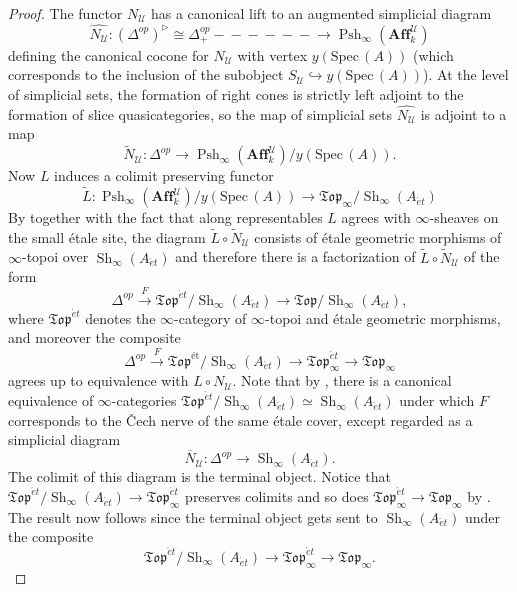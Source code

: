 \documentclass[12pt]{amsart}
\theoremstyle{definition}
\newcommand{\cU}{\mathcal{U}}
\newcommand{\Affku}{\mathbf{Aff}^{\cU}_{k}}
\newcommand{\Topi}{\mathfrak{Top}_\i}
\newcommand{\Spec}{\mathrm{Spec}\,}
\newcommand{\Sh}{\operatorname{Sh}}
\newcommand{\et}{\acute{e}t}
\renewcommand{\i}{\infty}
\def\Pshi{\operatorname{Psh}_\i}
\def\Shi{\Sh_\i}
\def\longlongrightarrow{-\!\!\!-\!\!\!-\!\!\!-\!\!\!-\!\!\!-\!\!\!\longrightarrow}
\begin{document}
\begin{proof}
The functor $N_\mathcal{U}$ has a canonical lift to an augmented simplicial diagram $$\widehat{N_\mathcal{U}}:\left(\Delta^{op}\right)^{\triangleright}\cong \Delta_{+}^{op} \longlongrightarrow \Pshi\left(\Affku\right)$$ defining the canonical cocone for $N_\mathcal{U}$ with vertex $y\left(\Spec\left(A\right)\right)$ (which corresponds to the inclusion of the subobject $S_\mathcal{U} \hookrightarrow y\left(\Spec\left(A\right)\right)$). At the level of simplicial sets, the formation of right cones is strictly left adjoint to the formation of slice quasicategories, so the map of simplicial sets $\widehat{N_\mathcal{U}}$ is adjoint to a map $$\widetilde{N}_\mathcal{U}:\Delta^{op} \to \Pshi\left(\Affku\right)/y\left(\Spec\left(A\right)\right).$$ Now $L$ induces a colimit preserving functor $$\widetilde{L}:\Pshi\left(\Affku\right)/y\left(\Spec\left(A\right)\right) \to \mathfrak{Top}_\i/\Shi\left(A_{\et}\right)$$ By \cite[Example 2.3.8]{dagv} together with the fact that along representables $L$ agrees with $\i$-sheaves on the small \'etale site, the diagram $\widetilde{L}\circ \widetilde{N}_{\mathcal{U}}$ consists of \'etale geometric morphisms of $\i$-topoi over $\Shi\left(A_{\et}\right)$ and therefore there is a factorization of $\widetilde{L}\circ \widetilde{N}_{\mathcal{U}}$ of the form $$\Delta^{op} \stackrel{F}{\longrightarrow} \mathfrak{Top}^{\et}/\Shi\left(A_{\et}\right) \to \mathfrak{Top}/\Shi\left(A_{\et}\right),$$ where $ \mathfrak{Top}^{\et}$ denotes the $\i$-category of $\i$-topoi and \'etale geometric morphisms, and moreover the composite $$\Delta^{op} \stackrel{F}{\longrightarrow} \mathfrak{Top}^{\mbox{\'et}}/\Shi\left(A_{\et}\right) \to \mathfrak{Top}^{\et}_\i \to \mathfrak{Top}_\i$$ agrees up to equivalence with $L \circ N_{\cU}.$ Note that by \cite[Remark 6.3.5.10]{htt}, there is a canonical equivalence of $\i$-categories $\mathfrak{Top}^{\et}/\Shi\left(A_{\et}\right) \simeq \Shi\left(A_{\et}\right)$ under which $F$ corresponds to the \v{C}ech nerve of the same \'etale cover, except regarded as a simplicial diagram $$\overline{N}_{\cU}:\Delta^{op} \to \Shi\left(A_{\et}\right).$$ The colimit of this diagram is the terminal object. Notice that $\mathfrak{Top}^{\et}/\Shi\left(A_{\et}\right) \to \mathfrak{Top}^{\et}_\i$ preserves colimits and so does $\mathfrak{Top}^{\et}_\i \to \mathfrak{Top}_\i$ by \cite[Theorem 6.3.5.13]{htt}. The result now follows since the terminal object gets sent to $\Shi\left(A_{\et}\right)$ under the composite $$\mathfrak{Top}^{\et}/\Shi\left(A_{\et}\right) \to \mathfrak{Top}^{\et}_\i \to \Topi.$$
\end{proof}
\end{document}
